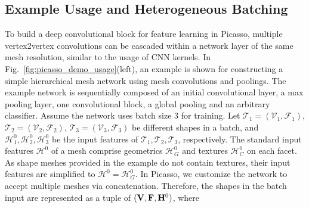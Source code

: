 \subsection{\color{black}Example Usage and Heterogeneous Batching}
To build a deep convolutional block for feature learning in Picasso, 
multiple vertex2vertex convolutions can be cascaded within a network layer of the same mesh resolution, similar to the usage of CNN kernels.
In Fig.~\ref{fig:picasso_demo_usage}(left),  an example is shown for constructing a simple hierarchical mesh network using mesh convolutions and poolings.
The example network is sequentially composed of an initial convolutional layer, a max pooling layer, one convolutional block, a global pooling and an arbitrary classifier. 
Assume the network uses batch size 3 for training. Let  $\mathcal{T}_1{=}(\mathcal{V}_1,\mathcal{F}_1)$, $\mathcal{T}_2{=}(\mathcal{V}_2,\mathcal{F}_2)$,  $\mathcal{T}_3{=}(\mathcal{V}_3,\mathcal{F}_3)$ be different shapes in a batch, and $\mathcal{H}^0_1,\mathcal{H}^0_2,\mathcal{H}^0_3$ be the input features of $\mathcal{T}_1, \mathcal{T}_2, \mathcal{T}_3$, respectively. The standard input features $\mathcal{H}^0$ of a mesh comprise geometrics $\mathcal{H}_G^0$ and textures $\mathcal{H}_C^0$ on each facet. As shape meshes provided in the example do not contain textures, their input features are simplified to   $\mathcal{H}^0{=}\mathcal{H}_G^0$. In Picasso, we customize the network to accept multiple meshes via concatenation. Therefore, the shapes in the batch input are represented as a tuple of $({\bf V}, {\bf F}, {\bf H}^0)$, where
